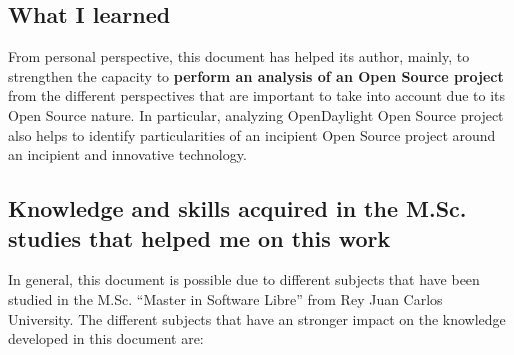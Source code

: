 \documentclass[a4paper, 12pt]{book}
\begin{document}
\subsection{What I learned}
From personal perspective, this document has helped its author, mainly, to strengthen the capacity to \textbf{perform an analysis of an Open Source project} from the different perspectives that are important to take into account due to its Open Source nature. In particular, analyzing OpenDaylight Open Source project also helps to identify particularities of an incipient Open Source project around an incipient and innovative technology.

\subsection{Knowledge and skills acquired in the M.Sc. studies that helped me on this work}
In general, this document is possible due to different subjects that have been studied in the M.Sc. ``Master in Software Libre'' from Rey Juan Carlos University. The different subjects that have an stronger impact on the knowledge developed in this document are:
\end{document}

